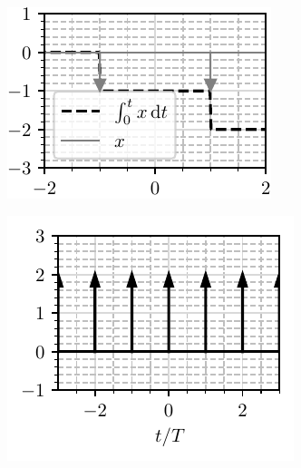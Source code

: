 \begin{figure}[ht!]
    \hspace*{0pt}\hfill
    \begin{subfigure}[c]{0.45\textwidth}
        \centering
        \includegraphics[scale=1]{fig/crtaj_ct_v.pdf}
        \caption{}
    \end{subfigure}
    \hspace*{0pt}\hfill
    \begin{subfigure}[c]{0.45\textwidth}
        \centering
        \includegraphics[scale=1]{fig/crtaj_ct_g.pdf}
        \caption{}
    \end{subfigure}
    \hfill
    \hspace*{0pt}

    \caption{}
\end{figure}